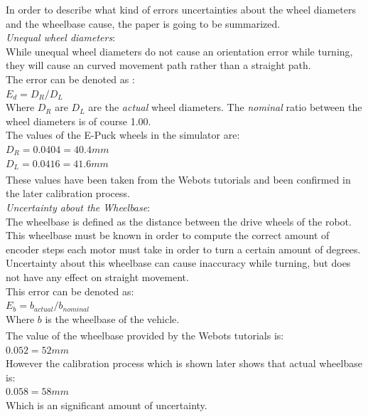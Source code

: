 In order to describe what kind of errors uncertainties about the wheel diameters and the wheelbase cause, the paper is going to be summarized. \\[3ex]

\textit{Unequal wheel diameters}:\\
While unequal wheel diameters do not cause an orientation error while turning, they will cause an curved movement path rather than a straight path.\\
The error can be denoted as :\\
$E_{d} = D_{R} / D_{L}$\\
Where $D_{R}$ are $D_{L}$ are the \textit{actual} wheel diameters. The \textit{nominal} ratio between the wheel diameters is of course 1.00\cite{Borenstein1996Measurement}.\\
The values of the E-Puck wheels in the simulator are:\\
$D_{R} = 0.0404 = 40.4mm$\\
$D_{L} = 0.0416 = 41.6mm$\\
These values have been taken from the Webots\textsuperscript{\texttrademark} tutorials and been confirmed in the later calibration process.\\

\textit{Uncertainty about the Wheelbase}:\\
The wheelbase is defined as the distance between the drive wheels of the robot. This wheelbase must be known in order to compute the correct amount of encoder steps each motor must take in order to turn a certain amount of degrees.
Uncertainty about this wheelbase can cause inaccuracy while turning, but does not have any effect on straight movement.\\
This error can be denoted as:\\
$E_{b} = b_{actual} / b_{nominal}$\\
Where $b$ is the wheelbase of the vehicle\cite{Borenstein1996Measurement}.\\
The value of the wheelbase provided by the Webots\textsuperscript{\texttrademark} tutorials is:\\
$0.052 = 52mm$\\
However the calibration process which is shown later shows that actual wheelbase is:\\
$0.058 = 58mm$\\
Which is an significant amount of uncertainty.\\

